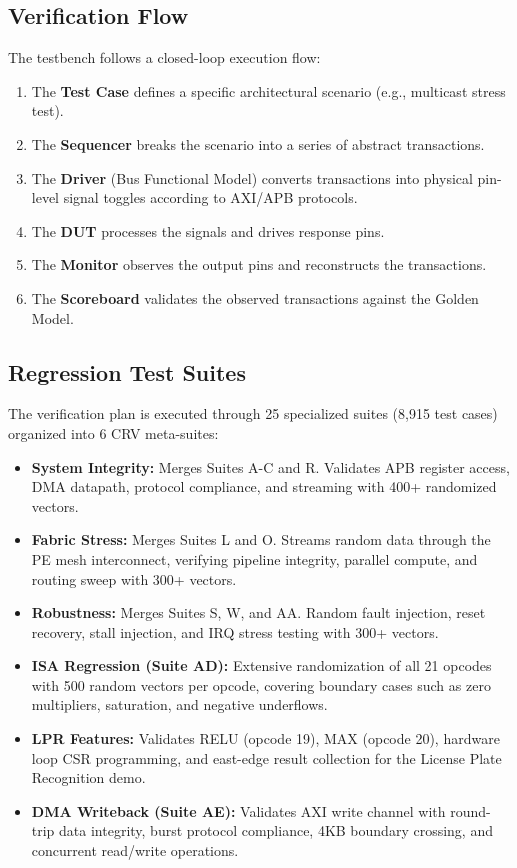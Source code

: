 \subsection{Verification Flow}
The testbench follows a closed-loop execution flow:
\begin{enumerate}
    \item The \textbf{Test Case} defines a specific architectural scenario (e.g., multicast stress test).
    \item The \textbf{Sequencer} breaks the scenario into a series of abstract transactions.
    \item The \textbf{Driver} (Bus Functional Model) converts transactions into physical pin-level signal toggles according to AXI/APB protocols.
    \item The \textbf{DUT} processes the signals and drives response pins.
    \item The \textbf{Monitor} observes the output pins and reconstructs the transactions.
    \item The \textbf{Scoreboard} validates the observed transactions against the Golden Model.
\end{enumerate}

\subsection{Regression Test Suites}
The verification plan is executed through 25 specialized suites (8,915 test cases) organized into 6 CRV meta-suites:
\begin{itemize}
    \item \textbf{System Integrity:} Merges Suites A-C and R. Validates APB register access, DMA datapath, protocol compliance, and streaming with 400+ randomized vectors.
    \item \textbf{Fabric Stress:} Merges Suites L and O. Streams random data through the PE mesh interconnect, verifying pipeline integrity, parallel compute, and routing sweep with 300+ vectors.
    \item \textbf{Robustness:} Merges Suites S, W, and AA. Random fault injection, reset recovery, stall injection, and IRQ stress testing with 300+ vectors.
    \item \textbf{ISA Regression (Suite AD):} Extensive randomization of all 21 opcodes with 500 random vectors per opcode, covering boundary cases such as zero multipliers, saturation, and negative underflows.
    \item \textbf{LPR Features:} Validates RELU (opcode 19), MAX (opcode 20), hardware loop CSR programming, and east-edge result collection for the License Plate Recognition demo.
    \item \textbf{DMA Writeback (Suite AE):} Validates AXI write channel with round-trip data integrity, burst protocol compliance, 4KB boundary crossing, and concurrent read/write operations.
\end{itemize}

